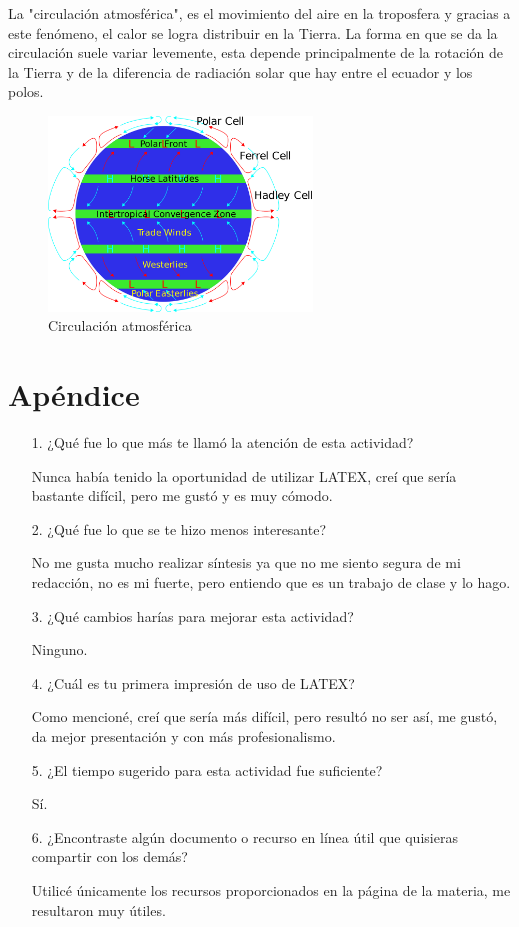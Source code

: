 \documentclass{article}
\begin{document}
La "circulación atmosférica", es el movimiento del aire en la troposfera y gracias a este fenómeno, el calor se logra distribuir en la Tierra. La forma en que se da la circulación suele variar levemente, esta depende principalmente de la rotación de la Tierra y de la diferencia de radiación solar que hay entre el ecuador y los polos. 
\begin{figure}[h!]
  \includegraphics[width=7cm]{4.png}
  \centering
  \caption{Circulación atmosférica}
  \label{fig:4}
\end{figure}


\section{Apéndice}

\begin{itemize}
\item [1.]¿Qué fue lo que más te llamó la atención de esta actividad?

Nunca había tenido la oportunidad de utilizar LATEX, creí que sería bastante difícil, pero me gustó y es muy cómodo. 

\item [2.]¿Qué fue lo que se te hizo menos interesante?

No me gusta mucho realizar síntesis ya que no me siento segura de mi redacción, no es mi fuerte, pero entiendo que es un trabajo de clase y lo hago. 

\item [3.]¿Qué cambios harías para mejorar esta actividad? 

Ninguno. 

\item [4.]¿Cuál es tu primera impresión de uso de LATEX?

Como mencioné, creí que sería más difícil, pero resultó no ser así, me gustó, da mejor presentación y con más profesionalismo.

\item [5.]¿El tiempo sugerido para esta actividad fue suficiente? 

Sí.

\item [6.]¿Encontraste algún documento o recurso en línea útil que quisieras compartir con los demás? 

Utilicé únicamente los recursos proporcionados en la página de la materia, me resultaron muy útiles.

\end {itemize}
\end{document}
